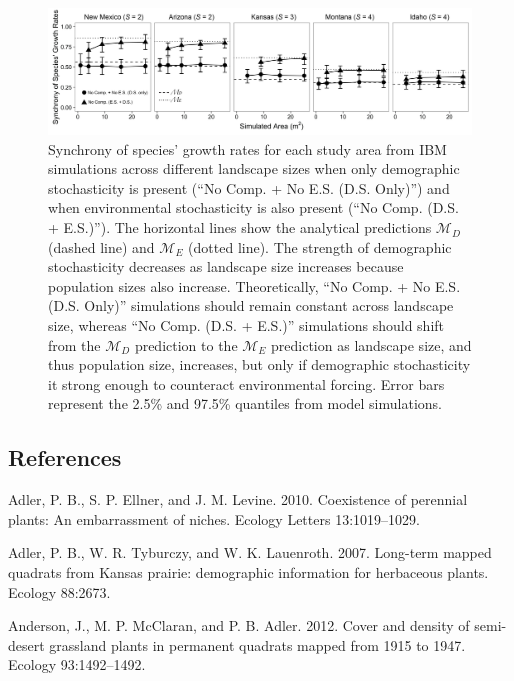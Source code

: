 \documentclass[12pt,]{article}
\begin{document}
\pagebreak{}

\begin{figure}[!ht]
  \centering
      \includegraphics[width=6in]{./components/formatted_figures/formatted_figure2.png}
  \caption{Synchrony of species' growth rates for each study area from IBM simulations across different landscape sizes when only demographic stochasticity is present (``No Comp. + No E.S. (D.S. Only)'') and when environmental stochasticity is also present (``No Comp. (D.S. + E.S.)''). The horizontal lines show the analytical predictions $\mathcal{M}_D$ (dashed line) and $\mathcal{M}_E$ (dotted line). The strength of demographic stochasticity decreases as landscape size increases because population sizes also increase. Theoretically, ``No Comp. + No E.S. (D.S. Only)'' simulations should remain constant across landscape size, whereas ``No Comp. (D.S. + E.S.)'' simulations should shift from the $\mathcal{M}_D$ prediction to the $\mathcal{M}_E$ prediction as landscape size, and thus population size, increases, but only if demographic stochasticity it strong enough to counteract environmental forcing. Error bars represent the 2.5\% and 97.5\% quantiles from model simulations.}
\end{figure}

\pagebreak{}

\subsection*{References}\label{references}

Adler, P. B., S. P. Ellner, and J. M. Levine. 2010. Coexistence of
perennial plants: An embarrassment of niches. Ecology Letters
13:1019--1029.

Adler, P. B., W. R. Tyburczy, and W. K. Lauenroth. 2007. Long-term
mapped quadrats from Kansas prairie: demographic information for
herbaceous plants. Ecology 88:2673.

Anderson, J., M. P. McClaran, and P. B. Adler. 2012. Cover and density
of semi-desert grassland plants in permanent quadrats mapped from 1915
to 1947. Ecology 93:1492--1492.
\end{document}
